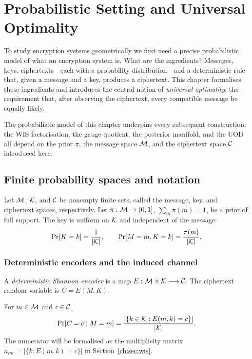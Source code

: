 \chapter[Probabilistic Setting]{Probabilistic Setting and Universal Optimality}\label{ch:sec:background}

To study encryption systems geometrically we first need a precise
probabilistic model of what an encryption system is.  What are the
ingredients?  Messages, keys, ciphertexts---each with a probability
distribution---and a deterministic rule that, given a message and a key,
produces a ciphertext.  This chapter formalises these ingredients and
introduces the central notion of \emph{universal optimality}: the
requirement that, after observing the ciphertext, every compatible
message be equally likely.

The probabilistic model of this chapter underpins every subsequent construction: the WIS factorisation, the gauge quotient, the posterior manifold, and the UOD all depend on the prior $\pi$, the message space $\mathcal{M}$, and the ciphertext space $\mathcal{C}$ introduced here.


\section{Finite probability spaces and notation}\label{ch:sec:finite-probability-spaces-and-notation}

Let $\mathcal{M}$, $\mathcal{K}$, and $\mathcal{C}$ be nonempty finite sets, called the
message, key, and ciphertext spaces, respectively.  Let
$\pi:\mathcal{M}\to(0,1]$, $\sum_m\pi(m)=1$, be a prior of full support.
The key is uniform on $\mathcal{K}$ and independent of the message:
\[
\Pr[K=k]=\frac1{|\mathcal{K}|},\qquad
\Pr[M=m,K=k]=\frac{\pi(m)}{|\mathcal{K}|}.
\]

\subsection{Deterministic encoders and the induced channel}\label{ch:sec:deterministic-encoders-and-the-induced-channel}

\begin{definition}\label{ch:def:encoder-basics}
A \emph{deterministic Shannon encoder} is a map
$E:\mathcal{M}\times\mathcal{K}\longrightarrow\mathcal{C}.$
The ciphertext random variable is $C=E(M,K)$.
\end{definition}

For $m\in\mathcal{M}$ and $c\in\mathcal{C}$,
\[
\Pr[C=c\mid M=m]
=\frac{|\{k\in\mathcal{K}:E(m,k)=c\}|}{|\mathcal{K}|}.
\]
The numerator will be formalised as the multiplicity matrix
$n_{mc}=|\{k:E(m,k)=c\}|$ in Section~\ref{ch:sec:wis}.

